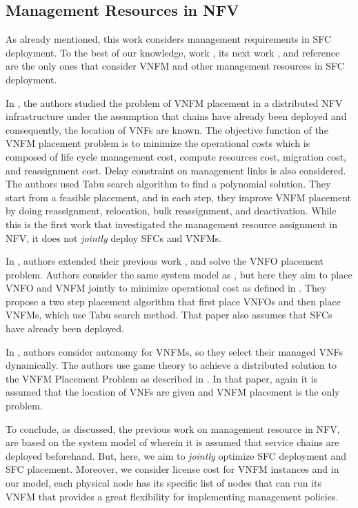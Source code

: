 \subsection{Management Resources in NFV}
As already mentioned, this work considers management requirements in SFC deployment. To the best of our knowledge, work \cite{AbuLebdeh2017}, its next work \cite{AbuLebdeh20172}, and reference \cite{Chiang2019} are the only ones that consider VNFM and other management resources in SFC deployment.

In \cite{AbuLebdeh2017}, the authors studied the problem of VNFM placement in a distributed NFV infrastructure under the assumption that chains have already been deployed and consequently, the location of VNFs are known.
The objective function of the VNFM placement problem is to minimize the operational costs which is composed of life cycle management cost, compute resources cost, migration cost, and reassignment cost. Delay constraint on management links is also considered. The authors used Tabu search algorithm 
to find a polynomial solution. They start from a feasible placement, and in each step, they improve VNFM placement by doing reassignment, relocation, bulk reassignment, and deactivation. While this is the first work that investigated the management resource assignment in NFV, it does not \textit{jointly} deploy SFCs and VNFMs. 

In \cite{AbuLebdeh20172}, authors extended their previous work \cite{AbuLebdeh2017}, and solve the VNFO placement problem.
Authors consider the same system model as \cite{AbuLebdeh2017}, but here they aim to place VNFO and VNFM jointly to  minimize operational cost as defined in \cite{AbuLebdeh2017}. They propose a two step placement algorithm that first place VNFOs and then place VNFMs, which use Tabu search method. That paper also assumes that SFCs have already been deployed.

In \cite{Chiang2019}, authors consider autonomy for VNFMs, so they select their managed VNFs dynamically. The authors use game theory to achieve a distributed solution to the VNFM Placement Problem as described in \cite{AbuLebdeh2017}. In that paper, again it is assumed that the location of VNFs are given and VNFM placement is the only problem.

To conclude, as discussed, the previous work on management resource in NFV, are based on the system model of \cite{AbuLebdeh2017} wherein it is assumed that service chains are deployed beforehand. But, here, we aim to \textit{jointly} optimize SFC deployment and SFC placement. Moreover, we consider license cost for VNFM instances and in our model, each physical node has its specific list of nodes that can run its VNFM that provides a great flexibility for implementing management policies.